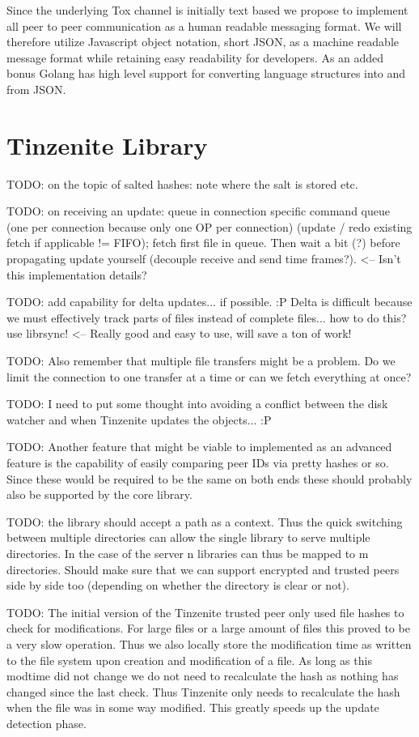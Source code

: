 Since the underlying Tox channel is initially text based we propose to implement all peer to peer communication as a human readable messaging format.
We will therefore utilize Javascript object notation, short JSON, as a machine readable message format while retaining easy readability for developers.
As an added bonus Golang has high level support for converting language structures into and from JSON.

\section{Tinzenite Library}

TODO: on the topic of salted hashes: note where the salt is stored etc.

TODO: on receiving an update: queue in connection specific command queue (one per connection because only one OP per connection) (update / redo existing fetch if applicable != FIFO); fetch first file in queue.
Then wait a bit (?) before propagating update yourself (decouple receive and send time frames?). <-- Isn't this implementation details?

TODO: add capability for delta updates... if possible. :P
Delta is difficult because we must effectively track parts of files instead of complete files... how to do this?
use librsync! <-- Really good and easy to use, will save a ton of work!

TODO: Also remember that multiple file transfers might be a problem.
Do we limit the connection to one transfer at a time or can we fetch everything at once?

TODO: I need to put some thought into avoiding a conflict between the disk watcher and when Tinzenite updates the objects... :P

TODO: Another feature that might be viable to implemented as an advanced feature is the capability of easily comparing peer IDs via pretty hashes or so.
Since these would be required to be the same on both ends these should probably also be supported by the core library.

TODO: the library should accept a path as a context.
Thus the quick switching between multiple directories can allow the single library to serve multiple directories.
In the case of the server n libraries can thus be mapped to m directories.
Should make sure that we can support encrypted and trusted peers side by side too (depending on whether the directory is clear or not).

TODO: The initial version of the Tinzenite trusted peer only used file hashes to check for modifications.
For large files or a large amount of files this proved to be a very slow operation.
Thus we also locally store the modification time as written to the file system upon creation and modification of a file.
As long as this modtime did not change we do not need to recalculate the hash as nothing has changed since the last check.
Thus Tinzenite only needs to recalculate the hash when the file was in some way modified.
This greatly speeds up the update detection phase.


